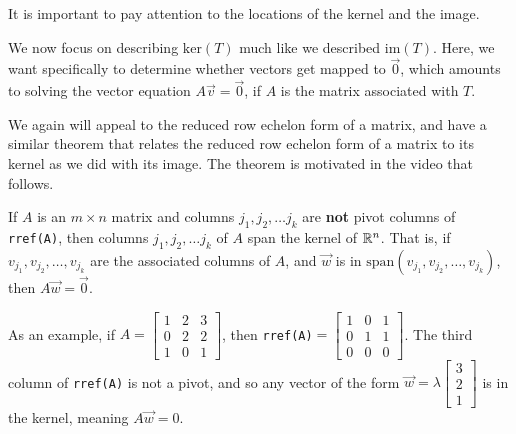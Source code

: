\documentclass{ximera}
\begin{document}
It is important to pay attention to the locations of the kernel and the image.
 
\begin{center}
\end{center}
 
We now focus on describing $\mbox{ker}(T)$ much like we described $\mbox{im}(T)$. Here, we want specifically to determine whether vectors get mapped to $\vec{0}$, which amounts to solving the vector equation $A\vec{v}=\vec{0}$, if $A$ is the matrix associated with $T$.

We again will appeal to the reduced row echelon form of a matrix, and have a similar theorem that relates the reduced row echelon form of a matrix to its kernel as we did with its image. The theorem is motivated in the video that follows.

\begin{theorem}
  If $A$ is an $m\times n$ matrix and columns $j_1, j_2, \ldots j_k$ are \textbf{not} pivot columns of \texttt{rref(A)}, then columns $j_1, j_2, \ldots j_k$ of $A$ span the kernel of $\mathbb{R}^n$. That is, if $v_{j_1}, v_{j_2}, \ldots, v_{j_k}$ are the associated columns of $A$, and $\vec{w}$ is in $\mbox{span}\left(v_{j_1}, v_{j_2}, \ldots, v_{j_k}\right)$, then $A\vec{w}=\vec{0}$.

  As an example, if $A=\begin{bmatrix}
    1 & 2 & 3\\
    0 & 2 & 2 \\
    1 & 0 & 1
  \end{bmatrix}$, then \texttt{rref(A)}$=\begin{bmatrix}
    1 & 0 & 1\\0&1&1\\0&0&0
  \end{bmatrix}$. The third column of \texttt{rref(A)} is not a pivot, and so any vector of the form $\vec{w}=\lambda \begin{bmatrix}
    3\\2\\1
  \end{bmatrix}$ is in the kernel, meaning $A\vec{w}=0$.
\end{theorem}
\end{document}
